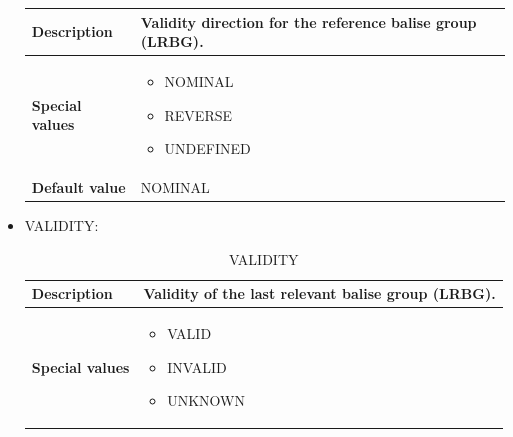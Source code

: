 \begin{itemize}
\begin{longtable}{|l|l|}
					\begin{minipage}[t]{0.22\linewidth} \textbf{Description} \end{minipage}
				&	\begin{minipage}[t]{0.78\linewidth} Validity direction for the reference balise group (LRBG). \end{minipage} \\

				\hline

					\begin{minipage}[t]{0.22\linewidth} \textbf{Special values}	\end{minipage}
				&	\begin{minipage}[t]{0.78\linewidth} \begin{itemize} \item NOMINAL \item REVERSE \item UNDEFINED \end{itemize} \end{minipage} \\

				\hline

					\begin{minipage}[t]{0.22\linewidth} \textbf{Default value}	\end{minipage}
				&	\begin{minipage}[t]{0.78\linewidth} NOMINAL \end{minipage} \\

				\hline

			\end{longtable}

		\item VALIDITY:

			\begin{longtable}{|l|l|}
				\caption{VALIDITY}\\
				\hline

					\begin{minipage}[t]{0.22\linewidth} \textbf{Description} \end{minipage}
				&	\begin{minipage}[t]{0.78\linewidth} Validity of the last relevant balise group (LRBG). \end{minipage} \\

				\hline

					\begin{minipage}[t]{0.22\linewidth} \textbf{Special values}	\end{minipage}
				&	\begin{minipage}[t]{0.78\linewidth} \begin{itemize} \item VALID \item INVALID \item UNKNOWN \end{itemize} \end{minipage} \\


\end{longtable}
\end{itemize}
